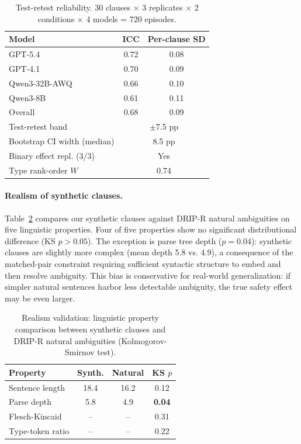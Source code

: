 \documentclass[11pt,a4paper]{article}
\begin{document}
\begin{table}[t]
\centering
\small
\caption{Test-retest reliability. 30 clauses $\times$ 3 replicates $\times$ 2 conditions $\times$ 4 models = 720 episodes.}
\label{tab:reliability}
\begin{tabular}{lcc}
\toprule
\textbf{Model} & \textbf{ICC} & \textbf{Per-clause SD} \\
\midrule
GPT-5.4 & 0.72 & 0.08 \\
GPT-4.1 & 0.70 & 0.09 \\
Qwen3-32B-AWQ & 0.66 & 0.10 \\
Qwen3-8B & 0.61 & 0.11 \\
\midrule
Overall & 0.68 & 0.09 \\
\midrule
Test-retest band & \multicolumn{2}{c}{$\pm$7.5 pp} \\
Bootstrap CI width (median) & \multicolumn{2}{c}{8.5 pp} \\
Binary effect repl. (3/3) & \multicolumn{2}{c}{Yes} \\
Type rank-order $W$ & \multicolumn{2}{c}{0.74} \\
\bottomrule
\end{tabular}
\end{table}


\paragraph{Realism of synthetic clauses.}
Table~\ref{tab:realism} compares our synthetic clauses against DRIP-R natural ambiguities on five linguistic properties. Four of five properties show no significant distributional difference (KS $p > 0.05$). The exception is parse tree depth ($p = 0.04$): synthetic clauses are slightly more complex (mean depth 5.8 vs. 4.9), a consequence of the matched-pair constraint requiring sufficient syntactic structure to embed and then resolve ambiguity. This bias is conservative for real-world generalization: if simpler natural sentences harbor less detectable ambiguity, the true safety effect may be even larger.


\begin{table}[t]
\centering
\small
\caption{Realism validation: linguistic property comparison between synthetic clauses and DRIP-R natural ambiguities (Kolmogorov-Smirnov test).}
\label{tab:realism}
\begin{tabular}{lccc}
\toprule
\textbf{Property} & \textbf{Synth.} & \textbf{Natural} & \textbf{KS $p$} \\
\midrule
Sentence length & 18.4 & 16.2 & 0.12 \\
Parse depth & 5.8 & 4.9 & \textbf{0.04} \\
Flesch-Kincaid & -- & -- & 0.31 \\
Type-token ratio & -- & -- & 0.22 \\
\bottomrule
\end{tabular}
\end{table}
\end{document}
